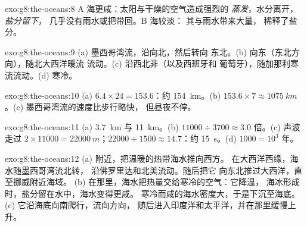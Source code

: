 \begin{solution}{exo:g8:the-oceans:8}
A 海更咸：太阳与干燥的空气造成强烈的
\emph{蒸发}，水分离开，\emph{盐分留下}，
几乎没有雨水或把\emph{}带回。B 海较淡：
其与雨水带来大量\emph{}，
稀释了盐分。
\end{solution}

\begin{solution}{exo:g8:the-oceans:9}
(a) 墨西哥湾流，沿向北，然后转向
东北。(b) 向东（东北方向），随北大西洋暖流
流动。(c) 沿西北非（以及西班牙和
葡萄牙），随加那利寒流流动。(d) 寒冷。
\end{solution}

\begin{solution}{exo:g8:the-oceans:10}
(a) $6.4 \times 24 = 153.6$：约 \qty{154}{km}。(b) $153.6 \times 7
\approx \qty{1075}{km}$。(c) 墨西哥湾流的速度比步行略快，
但昼夜不停。
\end{solution}

\begin{solution}{exo:g8:the-oceans:11}
(a) \qty{3.7}{km} 与 \qty{11}{km}。(b) $11000 \div 3700 \approx 3.0$
倍。(c) 声波走过 $2 \times 11000 = \qty{22000}{m}$；$22000
\div 1500 \approx 14.7$：约 \qty{15}{s}。(d) $1000 = 10^3$ 年。
\end{solution}

\begin{solution}{exo:g8:the-oceans:12}
(a) 附近，把温暖的热带海水推向西方。
在大西洋西缘，海水随墨西哥湾流北转，
沿佛罗里达和北美流动。随后把它
向东北推过大西洋，直至挪威附近海域。
(b) 在那里，海水把热量交给寒冷的空气：它降温，
海冰形成时，盐分留在水中，海水变得更咸。
寒冷而咸的海水密度大，于是下沉至海底。
(c) 它沿海底向南爬行，流向方向，
随后进入印度洋和太平洋，并在那里缓慢上升。
\end{solution}

